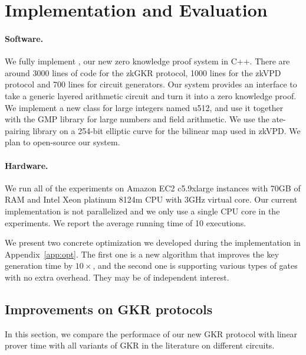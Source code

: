 
\section{Implementation and Evaluation}\label{sec:eval}

\paragraph{Software.} We fully implement \name, our new zero knowledge proof system in C++. There are around 3000 lines of code for the zkGKR protocol, 1000 lines for the zkVPD protocol and 700 lines for circuit generators. Our system provides an interface to take a generic layered arithmetic circuit and turn it into a zero knowledge proof. We implement a new class for large integers named u512, and use it together with the GMP\cite{GNU} library for large numbers and field arithmetic. We use the ate-pairing\cite{ate-pairing} library on a 254-bit elliptic curve for the bilinear map used in zkVPD. We plan to open-source our system.

\paragraph{Hardware.} We run all of the experiments on Amazon EC2 c5.9xlarge instances with 70GB of RAM and Intel Xeon platinum 8124m CPU with 3GHz virtual core. Our current implementation is not parallelized and we only use a single CPU core in the experiments. We report the average running time of 10 executions. %

We present two concrete optimization we developed during the implementation in Appendix~\ref{app:opt}. The first one is a new algorithm that improves the key generation time by $10\times$, and the second one is supporting various types of gates with no extra overhead. They may be of independent interest.





\subsection{Improvements on GKR protocols}\label{subsec:expGKR}

In this section, we compare the performace of our new GKR protocol with linear prover time with all variants of GKR in the literature on different circuits.

